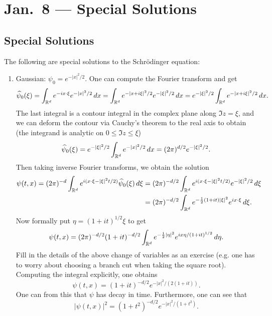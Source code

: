 \chapter{Jan.~8 --- Special Solutions}

\section{Special Solutions}
\begin{example}
  The following are special solutions to the
  Schr\"odinger equation:
  \begin{enumerate}
    \item Gaussian: $\psi_0 = e^{-|x|^2 / 2}$.
      One can compute the Fourier transform and get
      \[
        \widehat{\psi}_0(\xi)
        = \int_{\mathbb{R}^d} e^{-ix \cdot \xi} e^{-|x|^2 / 2} \, dx
        = \int_{\mathbb{R}^d} e^{-|x + i\xi|^2 / 2} e^{-|\xi|^2 / 2} \, dx
        = e^{-|\xi|^2 / 2}\int_{\mathbb{R}^d} e^{-|x + i\xi|^2 / 2} \, dx.
      \]
      The last integral is a contour integral in the
      complex plane along $\Im z = \xi$, and
      we can deform the contour via Cauchy's theorem
      to the real axis to obtain (the integrand is
      analytic on $0 \le \Im z \le \xi$)
      \[
        \widehat{\psi}_0(\xi)
        = e^{-|\xi|^2 / 2}\int_{\mathbb{R}^d} e^{-|x|^2 / 2} \, dx
        = (2\pi)^{d / 2} e^{-|\xi|^2 / 2}.
      \]
      Then taking inverse Fourier transforms, we obtain
      the solution
      \begin{align*}
        \psi(t, x)
        = (2\pi)^{-d} \int_{\mathbb{R}^d} e^{i(x \cdot \xi - |\xi|^2 t / 2)} \widehat{\psi}_0(\xi) \, d\xi
        &= (2\pi)^{-d / 2} \int_{\mathbb{R}^d} e^{i(x \cdot \xi - |\xi|^2 t / 2)} e^{-|\xi|^2 / 2} \, d\xi \\
        &= (2\pi)^{-d / 2} \int_{\mathbb{R}^d} e^{-\frac{1}{2}(1 + it)|\xi|^2} e^{ix \cdot \xi} \, d\xi.
      \end{align*}
      Now formally put $\eta = (1 + it)^{1 / 2} \xi$
      to get
      \[
        \psi(t, x) = (2\pi)^{-d / 2} (1 + it)^{-d / 2} \int_{\mathbb{R}^d} e^{-\frac{1}{2}|\eta|^2} e^{ix \eta / (1 + it)^{1 / 2}}\, d\eta.
      \]
      Fill in the details of the above change of
      variables as an exercise (e.g. one has to
      worry about choosing a branch cut when taking
      the square root). Computing the integral explicitly,
      one obtains
      \[
        \psi(t, x) = (1 + it)^{-d / 2} e^{-|x|^2 / (2(1 + it))}.
      \]
      One can from this that $\psi$ has decay in
      time. Furthermore, one can see that
      \[
        |\psi(t, x)|^2 = (1 + t^2)^{-d / 2} e^{-|x|^2 / (1 + t^2)}.
\]
\end{enumerate}
\end{example}
